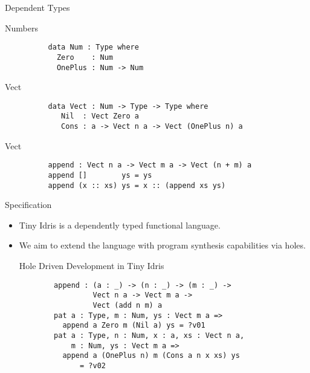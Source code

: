 \documentclass[presentation]{beamer}
\begin{document}
\begin{frame}[fragile]{Dependent Types}
      \begin{block}{Numbers}
        \begin{verbatim}
          data Num : Type where
            Zero    : Num
            OnePlus : Num -> Num 
        \end{verbatim}
      \end{block}
      \begin{block}{Vect}
        \begin{verbatim}
          data Vect : Num -> Type -> Type where
             Nil  : Vect Zero a
             Cons : a -> Vect n a -> Vect (OnePlus n) a
        \end{verbatim}
      \end{block}
      \begin{block}{Vect}
        \begin{verbatim}
          append : Vect n a -> Vect m a -> Vect (n + m) a
          append []        ys = ys
          append (x :: xs) ys = x :: (append xs ys)
        \end{verbatim}
      \end{block}
\end{frame}

\begin{frame}[fragile]{Specification}
  \begin{itemize}
  \item Tiny Idris is a dependently typed functional language.\\
  \item We aim to extend the language with program synthesis capabilities via holes. 
    \begin{block}{Hole Driven Development in Tiny Idris}
      \begin{verbatim}
        append : (a : _) -> (n : _) -> (m : _) ->
                 Vect n a -> Vect m a ->
                 Vect (add n m) a
        pat a : Type, m : Num, ys : Vect m a =>
          append a Zero m (Nil a) ys = ?v01
        pat a : Type, n : Num, x : a, xs : Vect n a,
            m : Num, ys : Vect m a =>
          append a (OnePlus n) m (Cons a n x xs) ys
              = ?v02
      \end{verbatim}
    \end{block}
  \end{itemize}
\end{frame}
\end{document}
